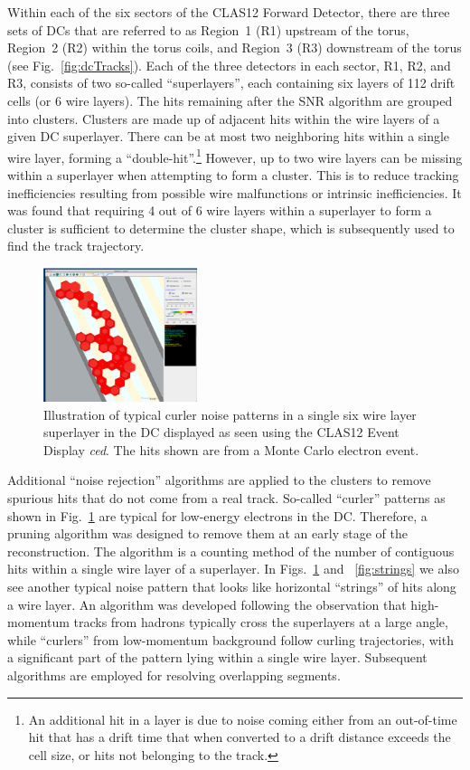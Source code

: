 Within each of the six sectors of the CLAS12 Forward Detector, there are three sets of DCs that are referred to
as Region~1 (R1) upstream of the torus, Region~2 (R2) within the torus coils, and Region~3 (R3) downstream
of the torus (see Fig.~\ref{fig:dcTracks}). Each of the three detectors in each sector, R1, R2, and R3, consists of
two so-called ``superlayers'',  each containing six layers of 112 drift cells (or 6 wire layers). The hits remaining
after the SNR algorithm are grouped into clusters. Clusters are made up of adjacent hits within the wire layers of
a given DC superlayer. There can be at most two neighboring hits within a single wire layer, forming a
``double-hit''.\footnote{An additional hit in a layer is due to noise coming either from an out-of-time hit that has a
  drift time that when converted to a drift distance exceeds the cell size, or hits not belonging to the track.}  However,
up to two wire layers can be missing within a superlayer when attempting to form a cluster. This is to reduce tracking
inefficiencies resulting from possible wire malfunctions or intrinsic inefficiencies. It was found that requiring 4 out of
6 wire layers within a superlayer to form a cluster is sufficient to determine the cluster shape, which is subsequently
used to find the track trajectory.

\begin{figure}
\centering
\includegraphics[width=0.4\textwidth]{pics/elooper.png}
\caption{Illustration of typical curler noise patterns in a single six wire layer superlayer in the DC displayed as seen
  using the CLAS12 Event Display {\it ced}. The hits shown are from a Monte Carlo electron event.}
\label{fig:eloop}
\end{figure}

Additional ``noise rejection'' algorithms are applied to the clusters to remove spurious hits that do not come from
a real track. So-called ``curler'' patterns as shown in Fig.~\ref{fig:eloop} are typical for low-energy electrons in
the DC.  Therefore, a pruning algorithm was designed to remove them at an early stage of the reconstruction. The
algorithm is a counting method of the number of contiguous hits within a single wire layer of a superlayer.  In
Figs.~\ref{fig:eloop} and ~\ref{fig:strings} we also see another typical noise pattern that looks like horizontal
``strings'' of hits along a wire layer. An algorithm was developed following  the observation that high-momentum
tracks from hadrons typically cross the superlayers at a large angle, while ``curlers'' from low-momentum
background follow curling trajectories, with a significant part of the pattern lying within a single wire layer.
Subsequent algorithms  are employed for resolving overlapping segments.   

